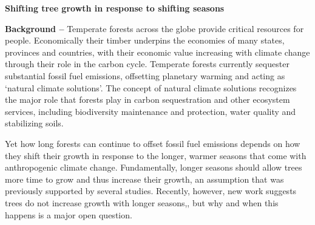 \documentclass[11pt,letter,oneside]{article}
\begin{document}

\renewcommand{\refname}{\CHead{}}
\begin{centering}
{\bf Shifting tree growth in response to shifting seasons}\\
\end{centering}
\vspace{1.5ex}
%
% 

{\bf Background --} Temperate forests across the globe provide critical resources for people.\cite{oldekop2020forest,costanza2016sustainable} Economically their timber underpins the economies of many states, provinces and countries, with their economic value increasing with climate change through their role in the carbon cycle. Temperate forests currently sequester substantial fossil fuel emissions, offsetting planetary warming and acting as `natural climate solutions'.\cite{pan2011large,griscom2017natural,friedlingstein2022global} The concept of natural climate solutions recognizes the major role that forests play in carbon sequestration and other ecosystem services, including biodiversity maintenance and protection, water quality and stabilizing soils. 

Yet how long forests can continue to offset fossil fuel emissions depends on how they shift their growth in response to the longer, warmer seasons that come with anthropogenic climate change. Fundamentally, longer seasons should allow trees more time to grow and thus increase their growth, an assumption that was previously supported by several studies.\cite{keenan2014net,finzi2020} Recently, however, new work suggests trees do not increase growth with longer seasons,\cite{dow2022}, but why and when this happens is a major open question.\cite{wolkovich2025longer}
\end{document}
